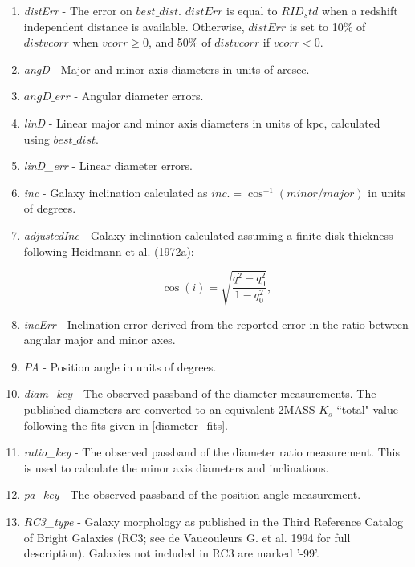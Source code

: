 \documentclass[iop]{emulateapj-rtx4}
\begin{document}
\begin{enumerate}
\item \textit{distErr} - The error on $best\_dist$. $distErr$ is equal to $RID_std$ when a redshift independent distance is available. Otherwise, $distErr$ is set to 10\% of $distvcorr$ when $vcorr \geq 0$, and 50\% of $distvcorr$ if $vcorr < 0$.

\item \textit{angD} - Major and minor axis diameters in units of arcsec. 

\item \textit{$angD\_err$} - Angular diameter errors. 

\item \textit{linD} - Linear major and minor axis diameters in units of kpc, calculated using $best\_dist$.

\item \textit{linD\_err} - Linear diameter errors.

\item \textit{inc} - Galaxy inclination calculated as $inc. = \cos^{-1} (minor / major)$ in units of degrees.

\item \textit{adjustedInc} - Galaxy inclination calculated assuming a finite disk thickness following Heidmann et al. (1972a):

\begin{equation}
	\cos(i) = \sqrt{\frac{q^2 - q_0^2}{1 - q_0^2}},
	\label{incEq}
\end{equation}

\item \textit{incErr} - Inclination error derived from the reported error in the ratio between angular major and minor axes.

\item \textit{PA} - Position angle in units of degrees.

\item \textit{diam\_key} - The observed passband of the diameter measurements. The published diameters are converted to an equivalent 2MASS $K_s$ ``total" value following the fits given in \ref{diameter_fits}.

\item \textit{ratio\_key} - The observed passband of the diameter ratio measurement. This is used to calculate the minor axis diameters and inclinations.

\item \textit{pa\_key} - The observed passband of the position angle measurement. 

\item \textit{RC3\_type} - Galaxy morphology as published in the Third Reference Catalog of Bright Galaxies (RC3; see de Vaucouleurs G. et al. 1994 for full description). Galaxies not included in RC3 are marked '-99'.


\end{enumerate}
\end{document}
